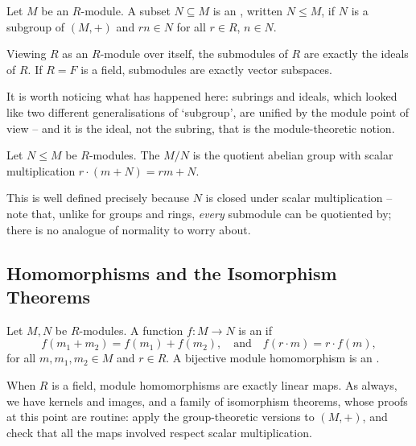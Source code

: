 \documentclass[a4paper]{scrartcl}
\begin{document}
\begin{definition}[Submodule]
	Let $M$ be an $R$-module. A subset $N \subseteq M$ is an , written $N \leq M$, if $N$ is a subgroup of $(M, +)$ and $rn \in N$ for all $r \in R$, $n \in N$.
\end{definition}

\begin{example}
	Viewing $R$ as an $R$-module over itself, the submodules of $R$ are exactly the ideals of $R$. If $R = F$ is a field, submodules are exactly vector subspaces.
\end{example}

It is worth noticing what has happened here: subrings and ideals, which looked like two different generalisations of `subgroup', are unified by the module point of view -- and it is the ideal, not the subring, that is the module-theoretic notion.

\begin{definition}
	Let $N \leq M$ be $R$-modules. The  $M/N$ is the quotient abelian group with scalar multiplication $r \cdot (m + N) = rm + N$.
\end{definition}

This is well defined precisely because $N$ is closed under scalar multiplication -- note that, unlike for groups and rings, \emph{every} submodule can be quotiented by; there is no analogue of normality to worry about.

\subsection{Homomorphisms and the Isomorphism Theorems}

\begin{definition}
	Let $M, N$ be $R$-modules. A function $f: M \rightarrow N$ is an  if
	$$
	f(m_1 + m_2) = f(m_1) + f(m_2), \quad \text{and} \quad f(r \cdot m) = r \cdot f(m),
	$$
	for all $m, m_1, m_2 \in M$ and $r \in R$. A bijective module homomorphism is an .
\end{definition}

When $R$ is a field, module homomorphisms are exactly linear maps. As always, we have kernels and images, and a family of isomorphism theorems, whose proofs at this point are routine: apply the group-theoretic versions to $(M, +)$, and check that all the maps involved respect scalar multiplication.
\end{document}
